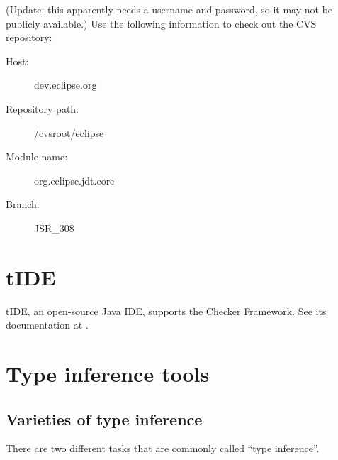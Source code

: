 (Update:  this apparently needs a username and password, so it may not be
publicly available.)
Use the following information to check
out the CVS repository:
\begin{description}
\item[Host:]                 dev.eclipse.org
\item[Repository path:] /cvsroot/eclipse
\item[Module name:]    org.eclipse.jdt.core
\item[Branch:]             JSR\_308
\end{description}


\section{tIDE\label{tide}}

tIDE, an open-source Java IDE, supports the Checker Framework.  See its
documentation at .


\section{Type inference tools\label{type-inference-tools}}

\subsection{Varieties of type inference}

There are two different tasks that are commonly called ``type inference''.

